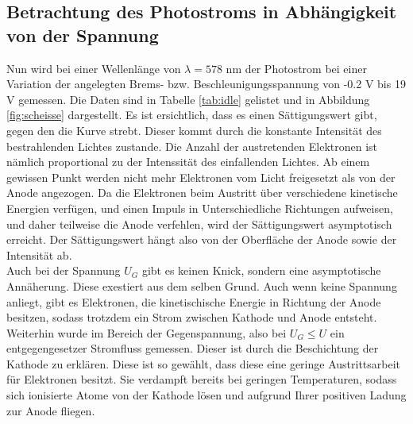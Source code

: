 \subsection{Betrachtung des Photostroms in Abhängigkeit von der Spannung}
  Nun wird bei einer Wellenlänge von $\lambda = 578$ nm der Photostrom bei einer Variation
  der angelegten Brems- bzw. Beschleunigungsspannung von -0.2 V bis 19 V gemessen. Die
  Daten sind in Tabelle \ref{tab:idle} gelistet und in Abbildung \ref{fig:scheisse} dargestellt.
  Es ist ersichtlich, dass es einen Sättigungswert gibt, gegen den die Kurve strebt.
  Dieser kommt durch die konstante Intensität des bestrahlenden Lichtes
  zustande. Die Anzahl der austretenden Elektronen ist nämlich proportional zu der
  Intenssität des einfallenden Lichtes.
  Ab einem gewissen Punkt werden nicht mehr Elektronen vom Licht freigesetzt
  als von der Anode angezogen. 
  Da die Elektronen beim Austritt über verschiedene kinetische Energien verfügen, 
  und einen Impuls in Unterschiedliche Richtungen aufweisen, und daher teilweise die Anode 
  verfehlen, wird der Sättigungswert asymptotisch erreicht. Der Sättigungswert hängt also 
  von der Oberfläche der Anode sowie der Intensität ab.\\
  Auch bei der Spannung $U_G$ gibt es keinen Knick, sondern eine asymptotische Annäherung.
  Diese exestiert aus dem selben Grund. Auch wenn keine Spannung anliegt, gibt es Elektronen,
  die kinetischische Energie in Richtung der Anode besitzen, sodass trotzdem ein Strom zwischen 
  Kathode und Anode entsteht. \\
  Weiterhin wurde im Bereich der Gegenspannung, also bei $U_G \leq U$ ein entgegengesetzer 
  Stromfluss gemessen. Dieser ist durch die Beschichtung der Kathode zu erklären. Diese
  ist so gewählt, dass diese eine geringe Austrittsarbeit für Elektronen besitzt. Sie 
  verdampft bereits bei geringen Temperaturen, sodass sich ionisierte Atome von der Kathode 
  lösen und aufgrund Ihrer positiven Ladung zur Anode fliegen.\\

